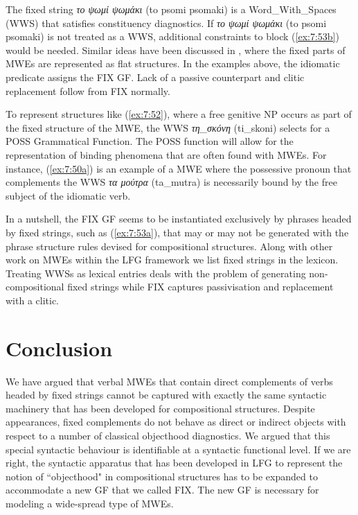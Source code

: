 \documentclass[output=paper]{langsci/langscibook}
\begin{document}
  The fixed string \textit{το ψωμί ψωμάκι} (to psomi psomaki) is a 
   Word\_With\_Spaces (WWS) \citep{Sag:2002} that satisfies constituency diagnostics.  If  \textit{το ψωμί ψωμάκι} (to psomi psomaki)  is not treated as a WWS, additional constraints to block (\ref{ex:7:53b}) would  be needed. Similar ideas have been discussed in \citet{green2013}, where the fixed parts of MWEs are represented as flat structures. In the examples above, the idiomatic predicate    assigns the FIX GF. Lack of a passive counterpart and clitic replacement follow from FIX normally. 
  
  To represent structures like (\ref{ex:7:52}), where a free genitive NP occurs as part of the fixed structure of the MWE, the WWS \textit{τη\_σκόνη} (ti\_skoni)  selects for a POSS Grammatical Function. The POSS function will allow for the representation of binding phenomena that are often found with MWEs. For instance, (\ref{ex:7:50a}) is an example of a MWE where the possessive pronoun that complements the WWS  \textit{τα μούτρα} (ta\_mutra) is necessarily bound by the free subject of the idiomatic verb. 

In a nutshell, the FIX GF seems to be instantiated exclusively by phrases headed by fixed strings, such as (\ref{ex:7:53a}), that may or may not be generated   with the phrase structure rules devised for compositional structures. Along with other work on MWEs within the LFG framework \citep{attia2006} we list fixed strings in the lexicon.  Treating WWSs as lexical entries deals with the problem of generating  non-compositional fixed strings while FIX captures passivisation and replacement with a clitic. 

\section{Conclusion}
\label{conclusion}

We have argued that verbal MWEs that contain direct complements of verbs headed by fixed strings cannot be captured with exactly the same syntactic machinery that has been developed for compositional structures. Despite appearances, fixed complements do not behave as direct or indirect objects with respect to a number of classical objecthood diagnostics. We argued that this special syntactic behaviour is identifiable at a syntactic functional level. If we are right, the syntactic apparatus that has been developed in LFG to represent the notion of ``objecthood" in compositional structures has to be expanded  to accommodate a new GF that we called FIX. The new GF is necessary for modeling a wide-spread type of MWEs.
\end{document}
